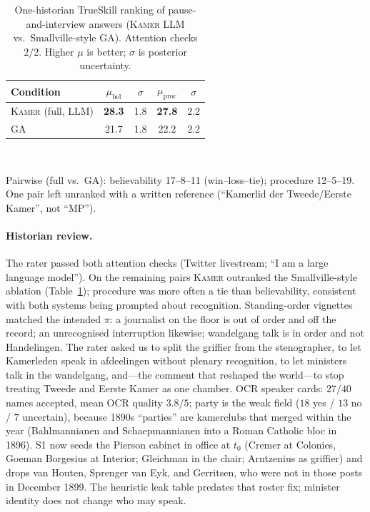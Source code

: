 \documentclass[sigconf,review,anonymous]{acmart}
\newcommand{\sys}{\textsc{Kamer}}
\begin{document}
\begin{table}[t]
\caption{One-historian TrueSkill ranking of pause-and-interview answers
(\sys{} LLM vs.\ Smallville-style GA). Attention checks $2/2$. Higher $\mu$
is better; $\sigma$ is posterior uncertainty.}
\label{tab:historian}
\centering\small
\setlength{\tabcolsep}{3.5pt}
\begin{tabular}{lcccc}
\toprule
Condition & $\mu_{\text{bel}}$ & $\sigma$ & $\mu_{\text{proc}}$ & $\sigma$ \\
\midrule
\sys{} (full, LLM) & \textbf{28.3} & 1.8 & \textbf{27.8} & 2.2 \\
GA~\cite{park2023generative} & 21.7 & 1.8 & 22.2 & 2.2 \\
\bottomrule
\end{tabular}\\[4pt]
{\raggedright\scriptsize Pairwise (full vs.\ GA): believability 17--8--11
(win--loss--tie); procedure 12--5--19. One pair left unranked with a
written reference (``Kamerlid der Tweede/Eerste Kamer'', not ``MP'').\par}
\end{table}

\paragraph{Historian review.} The rater passed both attention checks
(Twitter livestream; ``I am a large language model''). On the remaining
pairs \sys{} outranked the Smallville-style ablation
(Table~\ref{tab:historian}); procedure was more often a tie than
believability, consistent with both systems being prompted about
recognition. Standing-order vignettes matched the intended $\pi$: a
journalist on the floor is out of order and off the record; an
unrecognised interruption likewise; wandelgang talk is in order and not
Handelingen. The rater asked us to split the griffier from the
stenographer, to let Kamerleden speak in afdeelingen without plenary
recognition, to let ministers talk in the wandelgang, and---the comment
that reshaped the world---to stop treating Tweede and Eerste Kamer as one
chamber. OCR speaker cards: $27/40$ names accepted, mean OCR quality
$3.8/5$; party is the weak field ($18$ yes / $13$ no / $7$ uncertain),
because 1890s ``parties'' are kamerclubs that merged within the year
(Bahlmannianen and Schaepmannianen into a Roman Catholic bloc in 1896).
S1 now seeds the Pierson cabinet in office at $t_0$ (Cremer at Colonies,
Goeman Borgesius at Interior; Gleichman in the chair; Arntzenius as
griffier) and drops van Houten, Sprenger van Eyk, and Gerritsen, who were
not in those posts in December 1899. The heuristic leak table predates
that roster fix; minister identity does not change who may speak.
\end{document}

